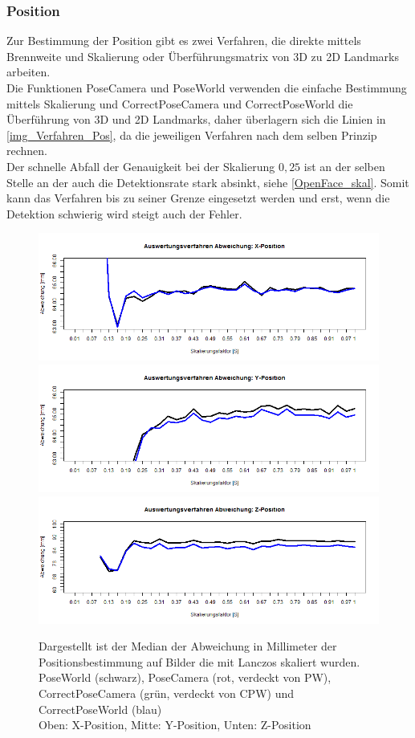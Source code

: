 \subsubsection{Position}
Zur Bestimmung der Position gibt es zwei Verfahren, die direkte mittels Brennweite und Skalierung oder Überführungsmatrix von 3D zu 2D Landmarks arbeiten.\\
Die Funktionen PoseCamera und PoseWorld verwenden die einfache Bestimmung mittels Skalierung und CorrectPoseCamera und CorrectPoseWorld die Überführung von 3D und 2D Landmarks, daher überlagern sich die Linien in \autoref{img_Verfahren_Pos}, da die jeweiligen Verfahren nach dem selben Prinzip rechnen.\\
Der schnelle Abfall der Genauigkeit bei der Skalierung $0,25$ ist an der selben Stelle an der auch die Detektionsrate stark absinkt, siehe \autoref{OpenFace_skal}. Somit kann das Verfahren bis zu seiner Grenze eingesetzt werden und erst, wenn die Detektion schwierig wird steigt auch der Fehler.
\begin{figure}
	\centering
	\includegraphics[width=\linewidth]{img_Skalierung/Verfahren_TX}
	\includegraphics[width=\linewidth]{img_Skalierung/Verfahren_TY}
	\includegraphics[width=\linewidth]{img_Skalierung/Verfahren_TZ}
	\caption{Dargestellt ist der Median der Abweichung in Millimeter der Positionsbestimmung auf Bilder die mit Lanczos skaliert wurden.\\
	PoseWorld (schwarz), PoseCamera (rot, verdeckt von PW), CorrectPoseCamera (grün, verdeckt von CPW) und CorrectPoseWorld (blau)\\
	Oben: X-Position, Mitte: Y-Position, Unten: Z-Position}
	\label{img_Verfahren_Pos}
\end{figure}
